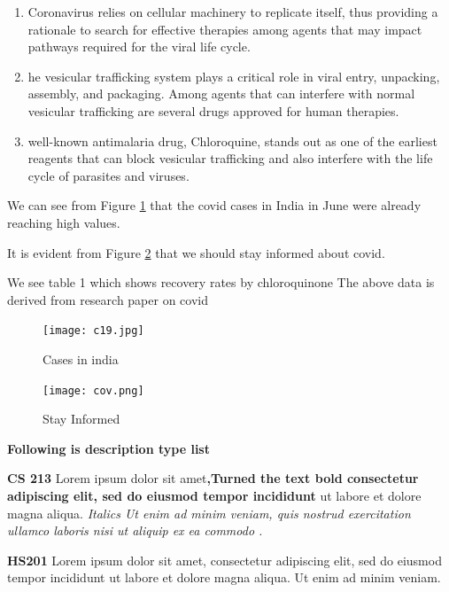 \documentclass[10pt]{article}
\begin{document}
\begin{enumerate}

\item Coronavirus relies on cellular machinery to replicate itself, thus providing
a rationale to search for effective therapies among agents that may impact
pathways required for the viral life cycle.

\item he vesicular trafficking system plays a critical role in viral entry, unpacking,
assembly, and packaging. Among agents that can interfere with normal
vesicular trafficking are several drugs approved for human therapies.

\item well-known antimalaria drug, Chloroquine, stands out as one of the earliest
reagents that can block vesicular trafficking and also interfere with the life
cycle of parasites and viruses.
\end{enumerate}

We can see from Figure \ref{fig:label2} that the covid cases in India in June were already reaching high values.
\medskip

It is evident from Figure \ref{fig:label3} that we should stay informed about covid.
\medskip

We see table 1 which shows recovery rates by chloroquinone
\newline The above data is derived from research paper on covid \cite{huang2020treating}

\newpage


\begin{figure}[hbt!]
\begin{center}

\texttt{[image: c19.jpg]}

\caption{Cases in india}
\label{fig:label2}
\end{center}
\end{figure}

\begin{figure}[hbt!]
\begin{center}

\texttt{[image: cov.png]}

\caption{Stay Informed}
\label{fig:label3}
\end{center}
\end{figure}

\textbf{Following is description type list}\\
\begin{description}
\item \textbf{CS 213} Lorem ipsum dolor sit amet\textbf{,Turned the text bold consectetur adipiscing elit, sed do eiusmod tempor incididunt} ut labore et
dolore magna aliqua.  \textit{Italics Ut enim ad minim veniam, quis nostrud
exercitation ullamco laboris nisi ut aliquip ex ea commodo .} \\


\bigskip 

\item \textbf{HS201}  Lorem ipsum dolor sit amet, consectetur adipiscing elit, sed do eiusmod tempor incididunt ut labore et dolore magna aliqua. Ut enim ad
minim veniam.

\end{description}
\end{document}
